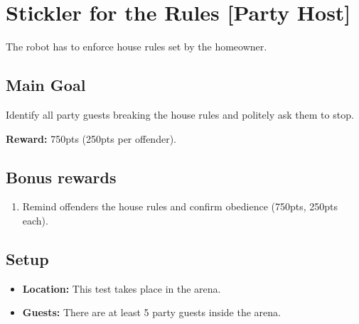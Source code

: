 \section{Stickler for the Rules [Party Host]}
\label{test:stickler-for-the-rules}
The robot has to enforce house rules set by the homeowner.


\subsection*{Main Goal}
Identify all party guests breaking the house rules and politely ask them to stop.

\noindent\textbf{Reward:} 750pts (250pts per offender).

\subsection*{Bonus rewards}
\begin{enumerate}[nosep]
	\item Remind offenders the house rules and confirm obedience (750pts, 250pts each).
\end{enumerate}

\subsection*{Setup}
\begin{itemize}[nosep]
	\item \textbf{Location:} This test takes place in the arena.
	\item \textbf{Guests:} There are at least 5 party guests inside the arena.
\end{itemize}



